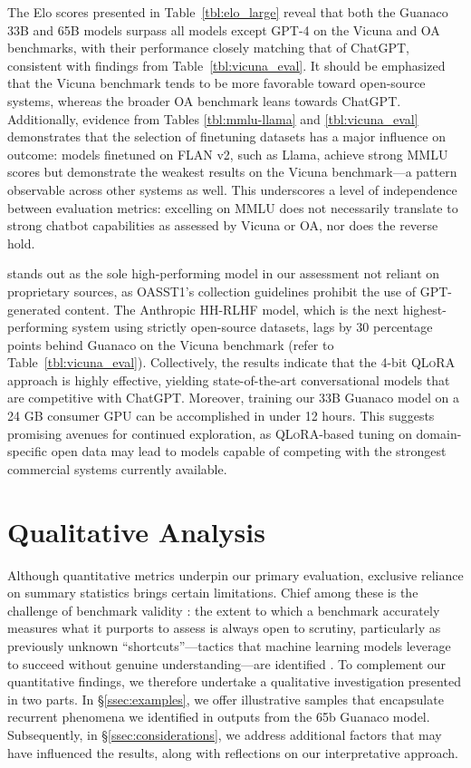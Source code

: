 The Elo scores presented in Table~\ref{tbl:elo_large} reveal that both the {Guanaco} 33B and 65B models surpass all models except GPT-4 on the Vicuna and OA benchmarks, with their performance closely matching that of ChatGPT, consistent with findings from Table~\ref{tbl:vicuna_eval}. It should be emphasized that the Vicuna benchmark tends to be more favorable toward open-source systems, whereas the broader OA benchmark leans towards ChatGPT. Additionally, evidence from Tables \ref{tbl:mmlu-llama} and \ref{tbl:vicuna_eval} demonstrates that the selection of finetuning datasets has a major influence on outcome: models finetuned on FLAN v2, such as Llama, achieve strong MMLU scores but demonstrate the weakest results on the Vicuna benchmark—a pattern observable across other systems as well. This underscores a level of independence between evaluation metrics: excelling on MMLU does not necessarily translate to strong chatbot capabilities as assessed by Vicuna or OA, nor does the reverse hold.

 stands out as the sole high-performing model in our assessment not reliant on proprietary sources, as OASST1’s collection guidelines prohibit the use of GPT-generated content. The Anthropic HH-RLHF model, which is the next highest-performing system using strictly open-source datasets, lags by 30 percentage points behind {Guanaco} on the Vicuna benchmark (refer to Table~\ref{tbl:vicuna_eval}). Collectively, the results indicate that the 4-bit \textsc{QLoRA} approach is highly effective, yielding state-of-the-art conversational models that are competitive with ChatGPT. Moreover, training our 33B {Guanaco} model on a 24 GB consumer GPU can be accomplished in under 12 hours. This suggests promising avenues for continued exploration, as \textsc{QLoRA}-based tuning on domain-specific open data may lead to models capable of competing with the strongest commercial systems currently available.

\section{Qualitative Analysis}

Although quantitative metrics underpin our primary evaluation, exclusive reliance on summary statistics brings certain limitations. Chief among these is the challenge of benchmark validity \citep{liao2021we}: the extent to which a benchmark accurately measures what it purports to assess is always open to scrutiny, particularly as previously unknown ``shortcuts''—tactics that machine learning models leverage to succeed without genuine understanding—are identified \citep{gururangan2018annotation, poliak2018hypothesis}. To complement our quantitative findings, we therefore undertake a qualitative investigation presented in two parts. In \S\ref{ssec:examples}, we offer illustrative samples that encapsulate recurrent phenomena we identified in outputs from the 65b {Guanaco} model. Subsequently, in \S\ref{ssec:considerations}, we address additional factors that may have influenced the results, along with reflections on our interpretative approach.

